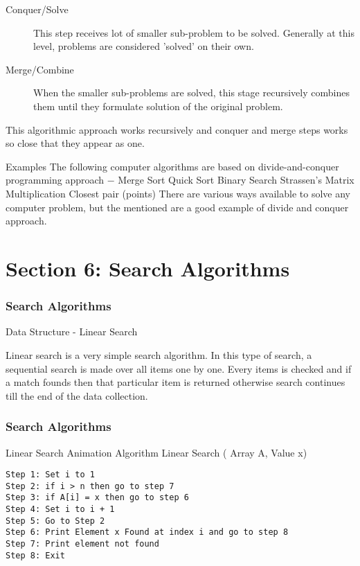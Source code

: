 \documentclass{beamer}
\begin{document}
\begin{frame}
\begin{description}
	\item[Conquer/Solve]
This step receives lot of smaller sub-problem to be solved. Generally at this level, problems are considered 'solved' on their own.

	\item[Merge/Combine]
When the smaller sub-problems are solved, this stage recursively combines them until they formulate solution of the original problem.
\end{description}
\end{frame}
\begin{frame}
This algorithmic approach works recursively and conquer and merge steps works so close that they appear as one.


\end{frame}
\begin{frame}
Examples
The following computer algorithms are based on divide-and-conquer programming approach −
Merge Sort
Quick Sort
Binary Search
Strassen's Matrix Multiplication
Closest pair (points)
There are various ways available to solve any computer problem, but the mentioned are a good example of divide and conquer approach.

\end{frame}

\section{Section 6: Search Algorithms}
\begin{frame}
\frametitle{Search Algorithms}
\large
Data Structure - Linear Search

Linear search is a very simple search algorithm. In this type of search, a sequential search is made over all items one by one. Every items is checked and if a match founds then that particular item is returned otherwise search continues till the end of the data collection.
\end{frame}

\begin{frame}[fragile]
\frametitle{Search Algorithms}
\large
Linear Search Animation
Algorithm
Linear Search ( Array A, Value x)
\begin{verbatim}
Step 1: Set i to 1
Step 2: if i > n then go to step 7
Step 3: if A[i] = x then go to step 6
Step 4: Set i to i + 1
Step 5: Go to Step 2
Step 6: Print Element x Found at index i and go to step 8
Step 7: Print element not found
Step 8: Exit
\end{verbatim}
\end{frame}
\end{document}
